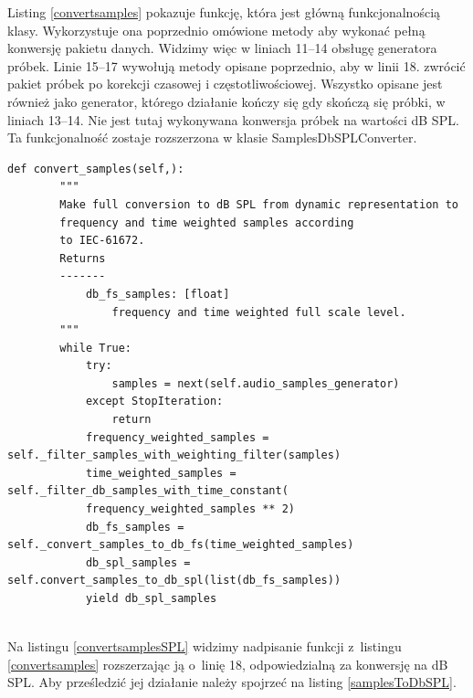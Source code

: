\documentclass[eng,printmode]{mgr}
\begin{document}
Listing \ref{convertsamples} pokazuje funkcję, która jest główną funkcjonalnością klasy. Wykorzystuje ona poprzednio omówione metody aby wykonać pełną konwersję pakietu danych. Widzimy więc w liniach 11--14 obsługę generatora próbek. Linie 15--17 wywołują metody opisane poprzednio, aby w linii 18. zwrócić pakiet próbek po korekcji czasowej i częstotliwościowej. Wszystko opisane jest również jako generator, którego działanie kończy się gdy skończą się próbki, w liniach 13--14. Nie jest tutaj wykonywana konwersja próbek na wartości dB SPL. Ta funkcjonalność zostaje rozszerzona w klasie SamplesDbSPLConverter.

\begin{minipage}{\linewidth}
\begin{lstlisting}[caption={fragment kodu źródłowego pliku SampleSPLConverter.py, klasa SamplesDbSPLConverter, metoda convert\_samples},captionpos=b,label={convertsamplesSPL}]
    def convert_samples(self,):
        """
        Make full conversion to dB SPL from dynamic representation to
        frequency and time weighted samples according
        to IEC-61672.
        Returns
        -------
            db_fs_samples: [float]
                frequency and time weighted full scale level.
        """
        while True:
            try:
                samples = next(self.audio_samples_generator)
            except StopIteration:
                return
            frequency_weighted_samples = self._filter_samples_with_weighting_filter(samples)
            time_weighted_samples = self._filter_db_samples_with_time_constant(
            frequency_weighted_samples ** 2)
            db_fs_samples = self._convert_samples_to_db_fs(time_weighted_samples)
            db_spl_samples = self.convert_samples_to_db_spl(list(db_fs_samples))
            yield db_spl_samples
 
\end{lstlisting}
\end{minipage}



Na listingu \ref{convertsamplesSPL} widzimy nadpisanie funkcji z~listingu \ref{convertsamples} rozszerzając ją o~linię 18, odpowiedzialną za konwersję na dB SPL. Aby prześledzić jej działanie należy spojrzeć na listing \ref{samplesToDbSPL}.
\end{document}
